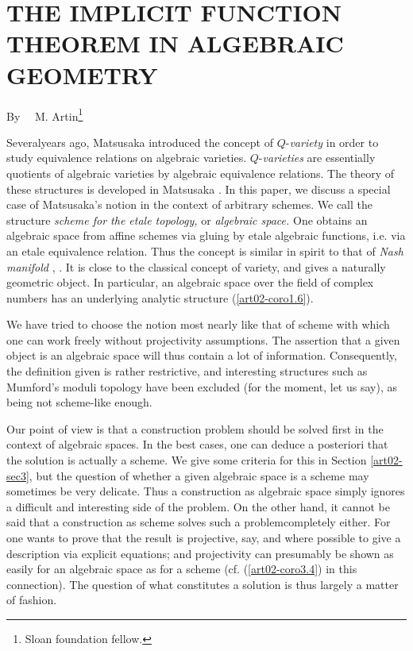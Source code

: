 \chapter[\textsc{M. Artin} : The Implicit Function Theorem in Algebraic Geometry]{THE IMPLICIT FUNCTION THEOREM IN ALGEBRAIC GEOMETRY}\label{art02}

\begin{center}
By~~ M. Artin\footnote{Sloan foundation fellow.}
\end{center}


\setcounter{pageoriginal}{12}
Several\pageoriginale years ago, Matsusaka introduced the concept of $Q$-{\em variety} in order to study equivalence relations on algebraic varieties. $Q$-{\em varieties} are essentially quotients of algebraic varieties by algebraic equivalence relations. The theory of these structures is developed in Matsusaka \cite{art02-key24}. In this paper, we discuss a special case of Matsusaka's notion in the context of arbitrary schemes. We call the structure {\em scheme for the etale topology,} or {\em algebraic space.} One obtains an algebraic space from affine schemes via gluing by etale algebraic functions, i.e. via an etale equivalence relation. Thus the concept is similar in spirit to that of {\em Nash manifold} \cite{art02-key29}, \cite{art02-key5}. It is close to the classical concept of variety, and gives a naturally geometric object. In particular, an algebraic space over the field of complex numbers has an underlying analytic structure (\ref{art02-coro1.6}).

We have tried to choose the notion most nearly like that of scheme with which one can work freely without projectivity assumptions. The assertion that a given object is an algebraic space will thus contain a lot of information. Consequently, the definition given is rather restrictive, and interesting structures such as Mumford's moduli topology \cite{art02-key26} have been excluded (for the moment, let us say), as being not scheme-like enough.

Our point of view is that a construction problem should be solved first in the context of algebraic spaces. In the best cases, one can deduce a posteriori that the solution is actually a scheme. We give some criteria for this in Section \ref{art02-sec3}, but the question of whether a given algebraic space is a scheme may sometimes be very delicate. Thus a construction as algebraic space simply ignores a difficult and interesting side of the problem. On the other hand, it cannot be said that a construction as scheme solves such a problem\pageoriginale completely either. For one wants to prove that the result is projective, say, and where possible to give a description via explicit equations; and projectivity can presumably be shown as easily for an algebraic space as for a scheme (cf. (\ref{art02-coro3.4}) in this connection). The question of what constitutes a solution is thus largely a matter of fashion.

